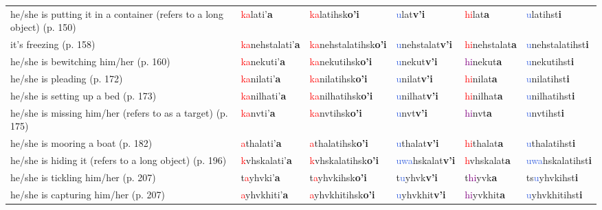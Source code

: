 \documentclass[oneside,openany]{book}%
\begin{document}
\begin{tabularx}{\textwidth}{>{\hsize=1.5\hsize\RaggedRight}X >{\hsize=0.9\hsize}X >{\hsize=0.9\hsize}X >{\hsize=0.9\hsize}X >{\hsize=0.9\hsize}X >{\hsize=0.9\hsize}X}
he/she is putting it in a container (refers to a long object) (p. 150)&\textcolor{Red}{ka}lati'\textbf{a}&\textcolor{Red}{ka}latihsk\textbf{o'i}&\textcolor{RoyalBlue}{u}lat\textbf{v'i}&\textcolor{Red}{hi}lat\textbf{a}&\textcolor{RoyalBlue}{u}latihst\textbf{i}\\%
it's freezing (p. 158)&\textcolor{Red}{ka}nehstalati'\textbf{a}&\textcolor{Red}{ka}nehstalatihsk\textbf{o'i}&\textcolor{RoyalBlue}{u}nehstalat\textbf{v'i}&\textcolor{Red}{hi}nehstalat\textbf{a}&\textcolor{RoyalBlue}{u}nehstalatihst\textbf{i}\\%
he/she is bewitching him/her (p. 160)&\textcolor{Red}{ka}nekuti'\textbf{a}&\textcolor{Red}{ka}nekutihsk\textbf{o'i}&\textcolor{RoyalBlue}{u}nekut\textbf{v'i}&\textcolor{Purple}{hi}nekut\textbf{a}&\textcolor{RoyalBlue}{u}nekutihst\textbf{i}\\%
he/she is pleading (p. 172)&\textcolor{Red}{ka}nilati'\textbf{a}&\textcolor{Red}{ka}nilatihsk\textbf{o'i}&\textcolor{RoyalBlue}{u}nilat\textbf{v'i}&\textcolor{Red}{hi}nilat\textbf{a}&\textcolor{RoyalBlue}{u}nilatihst\textbf{i}\\%
he/she is setting up a bed (p. 173)&\textcolor{Red}{ka}nilhati'\textbf{a}&\textcolor{Red}{ka}nilhatihsk\textbf{o'i}&\textcolor{RoyalBlue}{u}nilhat\textbf{v'i}&\textcolor{Red}{hi}nilhat\textbf{a}&\textcolor{RoyalBlue}{u}nilhatihst\textbf{i}\\%
he/she is missing him/her (refers to as a target) (p. 175)&\textcolor{Red}{ka}nvti'\textbf{a}&\textcolor{Red}{ka}nvtihsk\textbf{o'i}&\textcolor{RoyalBlue}{u}nvt\textbf{v'i}&\textcolor{Purple}{hi}nvt\textbf{a}&\textcolor{RoyalBlue}{u}nvtihst\textbf{i}\\%
he/she is mooring a boat (p. 182)&\textcolor{Red}{a}thalati'\textbf{a}&\textcolor{Red}{a}thalatihsk\textbf{o'i}&\textcolor{RoyalBlue}{u}thalat\textbf{v'i}&\textcolor{Red}{hi}thalat\textbf{a}&\textcolor{RoyalBlue}{u}thalatihst\textbf{i}\\%
he/she is hiding it (refers to a long object) (p. 196)&\textcolor{Red}{k}vhskalati'\textbf{a}&\textcolor{Red}{k}vhskalatihsk\textbf{o'i}&\textcolor{RoyalBlue}{uwa}hskalat\textbf{v'i}&\textcolor{Red}{h}vhskalat\textbf{a}&\textcolor{RoyalBlue}{uwa}hskalatihst\textbf{i}\\%
he/she is tickling him/her (p. 207)&t\textcolor{Red}{a}yhvki'\textbf{a}&t\textcolor{Red}{a}yhvkihsk\textbf{o'i}&t\textcolor{RoyalBlue}{u}yhvk\textbf{v'i}&t\textcolor{Purple}{hi}yvk\textbf{a}&ts\textcolor{RoyalBlue}{u}yhvkihst\textbf{i}\\%
he/she is capturing him/her (p. 207)&\textcolor{Red}{a}yhvkhiti'\textbf{a}&\textcolor{Red}{a}yhvkhitihsk\textbf{o'i}&\textcolor{RoyalBlue}{u}yhvkhit\textbf{v'i}&\textcolor{Purple}{hi}yvkhit\textbf{a}&\textcolor{RoyalBlue}{u}yhvkhitihst\textbf{i}\\%
\bottomrule%
\end{tabularx}%
\vspace{1em}%
\needspace{1in}%
\end{document}
